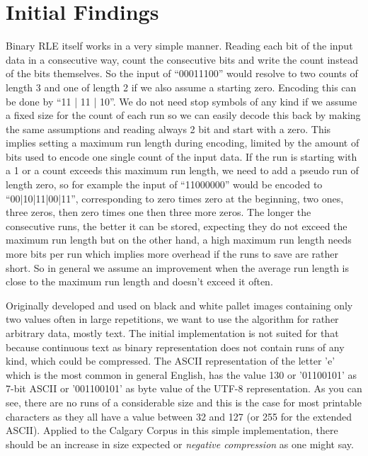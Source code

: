\section{Initial Findings}
\label{ch:Analysis:sec:Initial Findings}
\par{
	Binary RLE itself works in a very simple manner. Reading each bit of the input data in a consecutive way, count the consecutive bits and write the count instead of the bits themselves. So the input of \enquote{00011100} would resolve to two counts of length 3 and one of length 2 if we also assume a starting zero. Encoding this can be done by \enquote{11 | 11 | 10}.  We do not need stop symbols of any kind if we assume a fixed size for the count of each run so we can easily decode this back by making the same assumptions and reading always 2 bit and start with a zero. This implies setting a maximum run length during encoding, limited by the amount of bits used to encode one single count of the input data. If the run is starting with a 1 or a count exceeds this maximum run length, we need to add a pseudo run of length zero, so for example the input of \enquote{11000000} would be encoded to \enquote{00|10|11|00|11}, corresponding to zero times zero at the beginning, two ones, three zeros, then zero times one then three more zeros. The longer the consecutive runs, the better it can be stored, expecting they do not exceed the maximum run length but on the other hand, a high maximum run length needs more bits per run which implies more overhead if the runs to save are rather short. So in general we assume an improvement when the average run length is close to the maximum run length and doesn't exceed it often.
}
\par{
	Originally developed and used on black and white pallet images containing only two values often in large repetitions, we want to use the algorithm for rather arbitrary data, mostly text. The initial implementation is not suited for that because continuous text as binary representation does not contain runs of any kind, which could be compressed. The ASCII representation of the letter 'e' which is the most common in general English, has the value 130 or '01100101' as 7-bit ASCII or '001100101' as byte value of the UTF-8 representation. As you can see, there are no runs of a considerable size and this is the case for most printable characters as they all have a value between 32 and 127 (or 255 for the extended ASCII). Applied to the Calgary Corpus in this simple implementation, there should be an increase in size expected or \textit{negative compression} as one might say.
}

